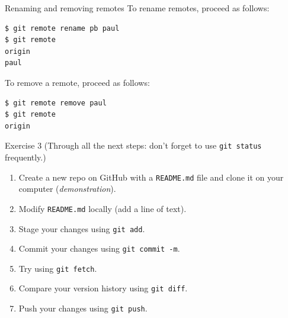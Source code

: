 \documentclass[handout]{beamer}
\begin{document}
\begin{frame}[fragile]{Renaming and removing remotes}
To rename remotes, proceed as follows: 
\begin{lstlisting}
$ git remote rename pb paul
$ git remote
origin
paul
\end{lstlisting}
To remove a remote, proceed as follows: 
\begin{lstlisting}
$ git remote remove paul
$ git remote
origin
\end{lstlisting} 

\end{frame}

\begin{frame}{Exercise 3}
(Through all the next steps: don't forget to use \texttt{git status} frequently.)
\begin{enumerate}
	\item Create a new repo on GitHub with a \texttt{README.md} file and clone it on your computer (\textit{demonstration}).
	\item Modify \texttt{README.md} locally (add a line of text).
	\item Stage your changes using \texttt{git add}.
	\item Commit your changes using \texttt{git commit -m}.
	\item Try using \texttt{git fetch}.
	\item Compare your version history using \texttt{git diff}.
	\item Push your changes using \texttt{git push}.
\end{enumerate}

\end{frame}
	
\end{document}
